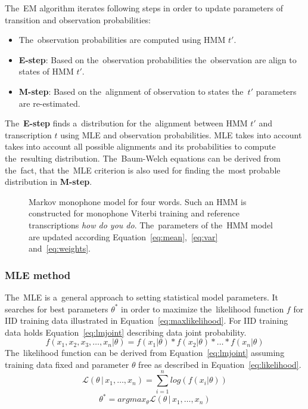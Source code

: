 The~\ac{EM} algorithm iterates following steps in order to update parameters of transition and observation probabilities:
\begin{itemize}
    \item The~observation probabilities are computed using \ac{HMM} $t'$. 
    \item {\bf E-step}: Based on the~observation probabilities the~observation are align to states of \ac{HMM} $t'$. 
    \item {\bf M-step}: Based on the~alignment of observation to states the~$t'$ parameters are re-estimated. 
\end{itemize}

The~{\bf E-step} finds a~distribution for the~alignment between \ac{HMM} $t'$ and transcription $t$ using \ac{MLE}\cite{gopinath1998maximum} and observation probabilities.
\ac{MLE} takes into account takes into account all possible alignments and its probabilities to compute the~resulting distribution.
The~Baum-Welch equations can be derived from the~fact, that the~\ac{MLE} criterion is also used for finding the~most probable distribution in {\bf M-step}.\cite{huang2001spoken}

\begin{figure}[!htp]
    \begin{center}
    
    \caption{Markov monophone model for four words. Such an \ac{HMM} is constructed for monophone Viterbi training and reference transcriptions \textit{how do you do}. The~parameters of the~\ac{HMM} model are updated according Equation~\ref{eq:mean},~\ref{eq:var} and~\ref{eq:weights}.}
    \label{fig:hmm_words} 
    \end{center}
\end{figure}

\subsubsection*{\acl{MLE} method}
\label{sub:mle_method}
The~\ac{MLE} is a~general approach to setting statistical model parameters.
It searches for best parameters $\theta^*$ in order to maximize the~likelihood function $f$ for \ac{IID} training data illustrated in Equation~\ref{eq:maxlikelihood}.
For \ac{IID} training data holds Equation~\ref{eq:lmjoint} describing data joint probability. 
\begin{equation}\label{eq:lmjoint}
    f(x_1, x_2, x_3, \ldots, x_n | \theta) = f(x_1 | \theta) * f(x_2 | \theta) * \ldots * f(x_n | \theta)
\end{equation}
The~likelihood function can be derived from Equation~\ref{eq:lmjoint} assuming training data fixed and parameter $\theta$ free as described in Equation~\ref{eq:likelihood}.
\begin{equation}\label{eq:likelihood}
    \mathcal{L}(\theta\,|\,x_1,\ldots,x_n) = \sum_{i=1}^n log(f(x_i|\theta))
\end{equation}
\begin{equation}\label{eq:maxlikelihood}
    \theta^* = argmax_{\theta} \mathcal{L}(\theta\,|\,x_1,\ldots,x_n)
\end{equation}

